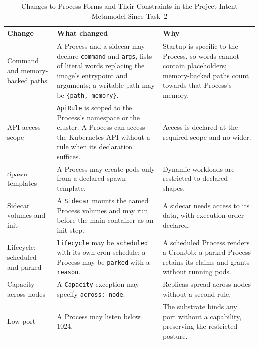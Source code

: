 \begin{table}[!htbp]
\centering
\footnotesize
\begin{tabular}{>{\raggedright\arraybackslash}p{}>{\raggedright\arraybackslash}p{}>{\raggedright\arraybackslash}p{}}
\hline
\textbf{Change} & \textbf{What changed} & \textbf{Why} \\
\hline
Command and memory-backed paths & A Process and a sidecar may declare \texttt{command} and \texttt{args}, lists of literal words replacing the image's entrypoint and arguments; a writable path may be \texttt{\{path, memory\}}. & Startup is specific to the Process, so words cannot contain placeholders; memory-backed paths count towards that Process's memory. \\
API access scope & \texttt{ApiRule} is scoped to the Process's namespace or the cluster. A Process can access the Kubernetes API without a rule when its declaration suffices. & Access is declared at the required scope and no wider. \\
Spawn templates & A Process may create pods only from a declared spawn template. & Dynamic workloads are restricted to declared shapes. \\
Sidecar volumes and init & A \texttt{Sidecar} mounts the named Process volumes and may run before the main container as an init step. & A sidecar needs access to its data, with execution order declared. \\
Lifecycle: scheduled and parked & \texttt{lifecycle} may be \texttt{scheduled} with its own cron schedule; a Process may be \texttt{parked} with a \texttt{reason}. & A scheduled Process renders a CronJob; a parked Process retains its claims and grants without running pods. \\
Capacity across nodes & A \texttt{Capacity} exception may specify \texttt{across: node}. & Replicas spread across nodes without a second rule. \\
Low port & A Process may listen below 1024. & The substrate binds any port without a capability, preserving the restricted posture. \\
\hline
\end{tabular}
\caption{Changes to Process Forms and Their Constraints in the Project Intent Metamodel Since Task~2}
\label{tab:app-source-2}
\end{table}

